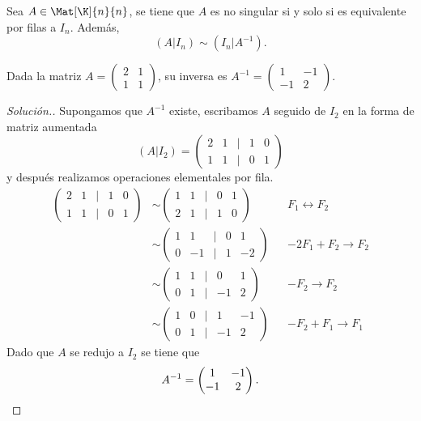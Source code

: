 \documentclass[compacto,10pt]{pubciencias-notas}
\begin{document}
\begin{teo}
    Sea $A \in \Mat[\K]{n}{n}$, se tiene que $A$ es no singular si y solo si es equivalente por filas a $I_n$. Además,
    \[
        (A|I_n) \sim (I_n|A^{-1}).
    \]
\end{teo}
\begin{ejem} 
Dada la matriz $A = \begin{pmatrix}2&1\\1&1\end{pmatrix}$, su inversa es $A^{- 1} = \begin{pmatrix}1&-1\\-1&2\end{pmatrix}$.

\begin{proof}[Solución.]\hspace{0pt} Supongamos que $A^{- 1}$ existe, escribamos $A$ seguido de $I_{2}$ en la forma de matriz aumentada
\[
    (A|I_{2}) =
    \begin{pmatrix}
    2&1&|&1&0\\
    1&1&|&0&1
    \end{pmatrix}
\]
y después realizamos operaciones elementales por fila.
\begin{align*}
    \begin{pmatrix}
    2&1&|&1&0\\
    1&1&|&0&1
    \end{pmatrix}
    &\sim
    \begin{pmatrix}
    1&1&|&0&1\\
    2&1&|&1&0
    \end{pmatrix}
    && F_{1} \leftrightarrow F_{2}\\
    &\sim
    \begin{pmatrix}
    1&1&|&0&1\\
    0&-1&|&1&-2
    \end{pmatrix}
    &&-2F_{1} + F_{2} \to F_{2}\\
    &\sim
    \begin{pmatrix}
    1&1&|&0&1\\
    0&1&|&-1&2
    \end{pmatrix}
    &&-F_{2} \to F_{2}\\
    &\sim
    \begin{pmatrix}
    1&0&|&1&-1\\
    0&1&|&-1&2
    \end{pmatrix}
    &&-F_{2} + F_{1}\to F_{1}
\end{align*}
Dado que $A$ se redujo a $I_{2}$ se tiene que
\[
    A^{- 1} = 
    \begin{pmatrix}
    1&-1\\
    -1&2
    \end{pmatrix}.\qedhere
\]
\end{proof}
\end{ejem}
\end{document}
